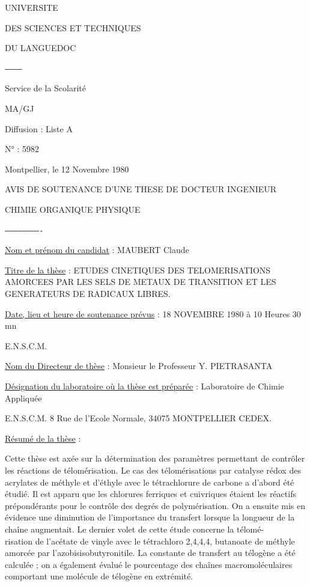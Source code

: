 UNIVERSITE

DES SCIENCES ET TECHNIQUES

DU LANGUEDOC

\texttt{------------}

Service de la Scolarité

MA/GJ

Diffusion : Liste A

N° : 5982

Montpellier, le 12 Novembre 1980

AVIS DE SOUTENANCE D'UNE THESE DE DOCTEUR INGENIEUR

CHIMIE ORGANIQUE PHYSIQUE

\texttt{-------------------------}

\uline{Nom et prénom du candidat} : MAUBERT Claude

\uline{Titre de la thèse} : ETUDES CINETIQUES DES TELOMERISATIONS AMORCEES PAR LES SELS DE METAUX DE TRANSITION ET LES GENERATEURS DE RADICAUX LIBRES.

\uline{Date, lieu et heure de soutenance prévus} : 18 NOVEMBRE 1980 à 10 Heures 30 mn

E.N.S.C.M.

\uline{Nom du Directeur de thèse} : Monsieur le Professeur Y. PIETRASANTA

\uline{Désignation du laboratoire où la thèse est préparée} : Laboratoire de Chimie Appliquée

E.N.S.C.M. 8 Rue de l'Ecole Normale, 34075 MONTPELLIER CEDEX.

\uline{Résumé de la thèse} :

Cette thèse est axée sur la détermination des paramètres permettant de contrôler les réactions de télomérisation. Le cas des télomérisations par catalyse rédox des acrylates de méthyle et d'éthyle avec le tétrachlorure de carbone a d'abord été étudié. Il est apparu que les chlorures ferriques et cuivriques étaient les réactifs prépondérants pour le contrôle des degrés de polymérisation. On a ensuite mis en évidence une diminution de l'importance du transfert lorsque la longueur de la chaîne augmentait. Le dernier volet de cette étude concerne la télomé-\\
risation de l'acétate de vinyle avec le tétrachloro 2,4,4,4, butanoate de méthyle amorcée par l'azobisisobutyronitile. La constante de transfert au télogène a été calculée ; on a également évalué le pourcentage des chaînes macromoléculaires comportant une molécule de télogène en extrémité.

